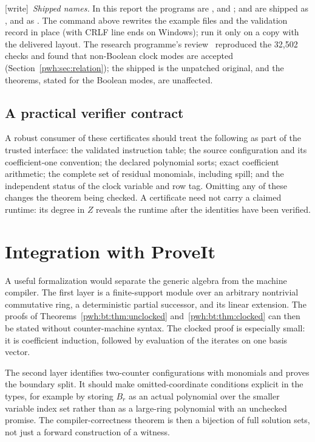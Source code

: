 \documentclass[11pt,letterpaper]{article}
\numberwithin{equation}{section}
\theoremstyle{definition}
\newcommand{\wtag}{\textup{[write]}}
\begin{document}
\wtag\ \emph{Shipped names.} In this report the programs are
,
 and
;  and
 are shipped as
, and  as
. The command above rewrites the
example files and the validation record in place (with CRLF line ends on
Windows); run it only on a copy with the delivered layout. The research
programme's review~\cite{reviewBS} reproduced the 32,502 checks and found
that non-Boolean clock modes are accepted (Section~\ref{pwh:sec:relation});
the shipped  is the
unpatched original, and the theorems, stated for the Boolean modes, are
unaffected.

\subsection{A practical verifier contract}
A robust consumer of these certificates should treat the following as
part of the trusted interface: the validated instruction table; the
source configuration and its coefficient-one convention; the declared
polynomial sorts; exact coefficient arithmetic; the complete set of
residual monomials, including spill; and the independent status of the
clock variable and row tag. Omitting any of these changes the theorem
being checked. A certificate need not carry a claimed runtime:
its degree in $Z$ reveals the runtime after the identities have been
verified.

\section{Integration with ProveIt}\label{pwh:bt:sec:integration}

A useful formalization would separate the generic algebra from the
machine compiler. The first layer is a finite-support module over an
arbitrary nontrivial commutative ring, a deterministic partial
successor, and its linear extension. The proofs of
Theorems~\ref{pwh:bt:thm:unclocked} and~\ref{pwh:bt:thm:clocked} can then be stated
without counter-machine syntax. The clocked proof is especially small:
it is coefficient induction, followed by evaluation of the iterates on
one basis vector.

The second layer identifies two-counter configurations with monomials
and proves the boundary split. It should make omitted-coordinate
conditions explicit in the types, for example by storing $B_r$ as an
actual polynomial over the smaller variable index set rather than as a
large-ring polynomial with an unchecked promise. The compiler-correctness
theorem is then a bijection of full solution sets, not just a forward
construction of a witness.
\end{document}
